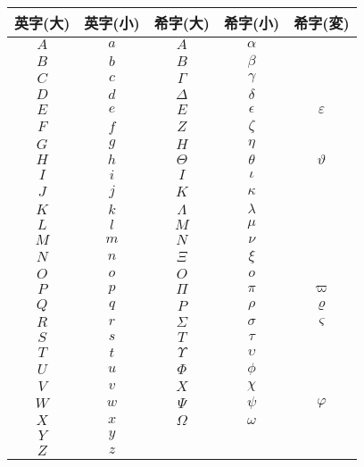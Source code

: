 
	\begin{table}[htb]
		\begin{tabular}{|c|c|c|c|c|} \hline
			英字(大) & 英字(小) & 希字(大) & 希字(小) & 希字(変) \\ \hline \hline
			$A$ & $a$ & $A$ & $\alpha$ & \\ \hline
			$B$ & $b$ & $B$ & $\beta$ & \\ \hline
			$C$ & $c$ & $\Gamma$ & $\gamma$ & \\ \hline
			$D$ & $d$ & $\Delta$ & $\delta$ & \\ \hline
			$E$ & $e$ & $E$ & $\epsilon$ & $\varepsilon$ \\ \hline
			$F$ & $f$ & $Z$ & $\zeta$ & \\ \hline
			$G$ & $g$ & $H$ & $\eta$ & \\ \hline
			$H$ & $h$ & $\Theta$ & $\theta$ & $\vartheta$ \\ \hline
			$I$ & $i$ & $I$ & $\iota$ & \\ \hline
			$J$ & $j$ & $K$ & $\kappa$ & \\ \hline
			$K$ & $k$ & $\Lambda$ & $\lambda$ & \\ \hline
			$L$ & $l$ & $M$ & $\mu$ & \\ \hline
			$M$ & $m$ & $N$ & $\nu$ & \\ \hline
			$N$ & $n$ & $\Xi$ & $\xi$ & \\ \hline
			$O$ & $o$ & $O$ & $o$ & \\ \hline
			$P$ & $p$ & $\Pi$ & $\pi$ & $\varpi$ \\ \hline
			$Q$ & $q$ & $P$ & $\rho$ & $\varrho$ \\ \hline
			$R$ & $r$ & $\Sigma$ & $\sigma$ & $\varsigma$ \\ \hline
			$S$ & $s$ & $T$ & $\tau$ & \\ \hline
			$T$ & $t$ & $\Upsilon$ & $\upsilon$ & \\ \hline
			$U$ & $u$ & $\Phi$ & $\phi$ & \\ \hline
			$V$ & $v$ & $X$ & $\chi$ & \\ \hline
			$W$ & $w$ & $\Psi$ & $\psi$ & $\varphi$ \\ \hline
			$X$ & $x$ & $\Omega$ & $\omega$ & \\ \hline
			$Y$ & $y$ & & & \\ \hline
			$Z$ & $z$ & & & \\ \hline
		\end{tabular}
		\label{tab:alphabet}
	\end{table}